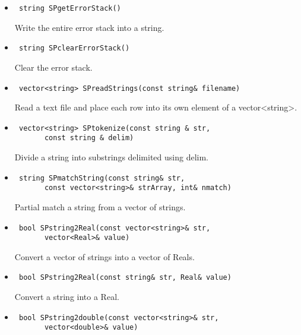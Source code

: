 \documentclass[11pt]{book}
\begin{document}
\begin{itemize}
\item  \begin{verbatim} string SPgetErrorStack() \end{verbatim}

          Write the entire error stack into a string.

\item  \begin{verbatim} string SPclearErrorStack() \end{verbatim}

          Clear the error stack.

\item  \begin{verbatim} vector<string> SPreadStrings(const string& filename) \end{verbatim}

          Read a text file and place each row into its own element of
          a vector<string>.

\item  \begin{verbatim} vector<string> SPtokenize(const string & str, 
       const string & delim) \end{verbatim}

          Divide a string into substrings delimited using delim.

\item  \begin{verbatim} string SPmatchString(const string& str, 
       const vector<string>& strArray, int& nmatch) \end{verbatim}

          Partial match a string from a vector of strings.

\item  \begin{verbatim} bool SPstring2Real(const vector<string>& str, 
       vector<Real>& value) \end{verbatim}

          Convert a vector of strings into a vector of Reals.

\item  \begin{verbatim} bool SPstring2Real(const string& str, Real& value) \end{verbatim}

          Convert a string into a Real.

\item  \begin{verbatim} bool SPstring2double(const vector<string>& str, 
       vector<double>& value) \end{verbatim}


\end{itemize}
\end{document}
